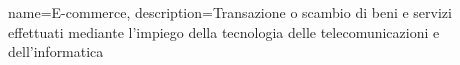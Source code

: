 {
	name={E-commerce},
	description={Transazione o scambio di beni e servizi effettuati mediante l'impiego della tecnologia delle telecomunicazioni e dell'informatica}
}